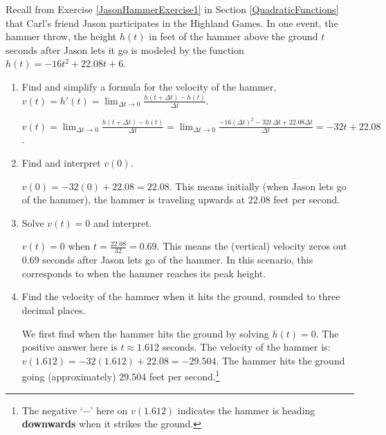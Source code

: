 \documentclass{ximera}
\begin{document}
\begin{problem}

 Recall from Exercise \ref{JasonHammerExercise1} in Section \ref{QuadraticFunctions} that Carl's friend Jason participates in the Highland Games. In one event, the hammer throw, the height $h(t)$ in feet of the hammer above the ground $t$ seconds after Jason lets it go is modeled by the function $h(t) = -16t^2 +  22.08t + 6$. 

\begin{enumerate}

\item  Find and simplify a formula for the velocity of the hammer, $v(t) = h'(t) = \lim_{\Delta t \rightarrow 0} \frac{h(t + \Delta t) - h(t)}{\Delta t}$.

\begin{solution}
$v(t) = \lim_{\Delta t \rightarrow 0} \frac{h(t + \Delta t) - h(t)}{\Delta t} = \lim_{\Delta t \rightarrow 0} \frac{-16(\Delta t)^2 -32 t \, \Delta t + 22.08 \Delta t}{\Delta t}  = -32t + 22.08$.
\end{solution}

\item  Find and interpret $v(0)$.

\begin{solution}
$v(0) = -32(0) + 22.08 = 22.08$. This means initially (when Jason lets go of the hammer), the hammer is traveling upwards at $22.08$ feet per second.
\end{solution}

\item  Solve $v(t) = 0$ and interpret.

\begin{solution}
 $v(t) = 0$  when $t = \frac{22.08}{32} = 0.69$.  This means the (vertical) velocity zeros out $0.69$ seconds after Jason lets go of the hammer.  In this scenario, this corresponds to when the hammer reaches its peak height.
\end{solution}

\item  Find the velocity of the hammer when it hits the ground, rounded to three decimal places.

\begin{solution}
We first find when the hammer hits the ground by solving $h(t) = 0$.  The positive answer here is   $t \approx 1.612$ seconds.  The velocity of the hammer is:  $v(1.612) = -32(1.612) + 22.08 = -29.504$.  The hammer hits the ground going (approximately) $29.504$ feet per second.\footnote{The negative `$-$' here on $v(1.612)$ indicates the hammer is heading \textbf{downwards} when it strikes the ground.}
\end{solution}

\end{enumerate}

\end{problem}
\end{document}
